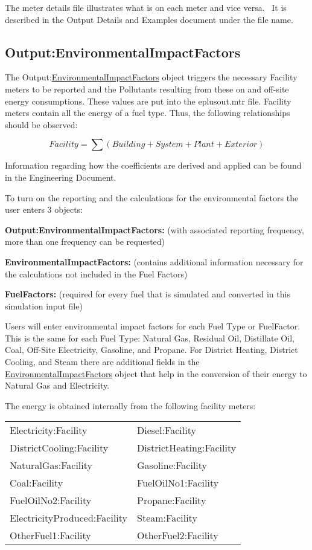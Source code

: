 The meter details file illustrates what is on each meter and vice versa.~ It is described in the Output Details and Examples document under the file name.

\subsection{Output:EnvironmentalImpactFactors}\label{outputenvironmentalimpactfactors}

The Output:\hyperref[environmentalimpactfactors]{EnvironmentalImpactFactors} object triggers the necessary Facility meters to be reported and the Pollutants resulting from these on and off-site energy consumptions. These values are put into the eplusout.mtr file. Facility meters contain all the energy of a fuel type. Thus, the following relationships should be observed:

\begin{equation}
Facility = \sum {\left( {Building + System + Plant + Exterior} \right)}
\end{equation}

Information regarding how the coefficients are derived and applied can be found in the Engineering Document.

To turn on the reporting and the calculations for the environmental factors the user enters 3 objects:

\textbf{Output:EnvironmentalImpactFactors:} (with associated reporting frequency, more than one frequency can be requested)

\textbf{EnvironmentalImpactFactors:} (contains additional information necessary for the calculations not included in the Fuel Factors)

\textbf{FuelFactors:} (required for every fuel that is simulated and converted in this simulation input file)

Users will enter environmental impact factors for each Fuel Type or FuelFactor. This is the same for each Fuel Type: Natural Gas, Residual Oil, Distillate Oil, Coal, Off-Site Electricity, Gasoline, and Propane. For District Heating, District Cooling, and Steam there are additional fields in the \hyperref[environmentalimpactfactors]{EnvironmentalImpactFactors} object that help in the conversion of their energy to Natural Gas and Electricity.

The energy is obtained internally from the following facility meters:

\begin{longtable}[c]{@{}ll@{}}
\toprule
%
%
Electricity:Facility & Diesel:Facility \tabularnewline
DistrictCooling:Facility & DistrictHeating:Facility \tabularnewline
NaturalGas:Facility & Gasoline:Facility \tabularnewline
Coal:Facility & FuelOilNo1:Facility \tabularnewline
FuelOilNo2:Facility & Propane:Facility \tabularnewline
ElectricityProduced:Facility & Steam:Facility \tabularnewline
OtherFuel1:Facility & OtherFuel2:Facility \tabularnewline
\bottomrule
\end{longtable}

